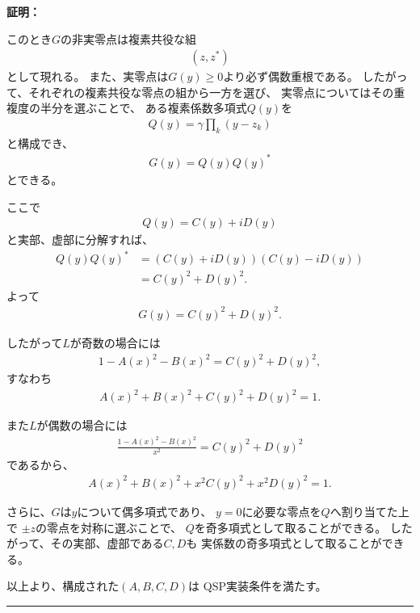 \documentclass[a4paper,10.5pt]{article}
\numberwithin{equation}{section}
\newenvironment{proofbox}
{\begin{prooflabel}\textbf{証明：}\end{prooflabel}\vspace{0.8em}}
{\par\vspace{1em}\hrule\vspace{1em}}
\begin{document}
\begin{proofbox}
    このとき$G$の非実零点は複素共役な組
    \begin{align*}
        (z,z^*)
    \end{align*}
    として現れる。
    また、実零点は$G(y)\geq0$より必ず偶数重根である。
    したがって、それぞれの複素共役な零点の組から一方を選び、
    実零点についてはその重複度の半分を選ぶことで、
    ある複素係数多項式$Q(y)$を
    \begin{align*}
        Q(y)=\gamma\prod_k(y-z_k)
    \end{align*}
    と構成でき、
    \begin{align*}
        G(y)=Q(y)Q(y)^*
    \end{align*}
    とできる。

    ここで
    \begin{align*}
        Q(y)=C(y)+iD(y)
    \end{align*}
    と実部、虚部に分解すれば、
    \begin{align*}
        Q(y)Q(y)^*
        &=(C(y)+iD(y))(C(y)-iD(y))\\
        &=C(y)^2+D(y)^2.
    \end{align*}
    よって
    \begin{align*}
        G(y)=C(y)^2+D(y)^2.
    \end{align*}

    したがって$L$が奇数の場合には
    \begin{align*}
        1-A(x)^2-B(x)^2
        =C(y)^2+D(y)^2,
    \end{align*}
    すなわち
    \begin{align*}
        A(x)^2+B(x)^2+C(y)^2+D(y)^2=1.
    \end{align*}

    また$L$が偶数の場合には
    \begin{align*}
        \frac{1-A(x)^2-B(x)^2}{x^2}
        =C(y)^2+D(y)^2
    \end{align*}
    であるから、
    \begin{align*}
        A(x)^2+B(x)^2
        +x^2C(y)^2+x^2D(y)^2=1.
    \end{align*}

    さらに、$G$は$y$について偶多項式であり、
    $y=0$に必要な零点を$Q$へ割り当てた上で
    $\pm z$の零点を対称に選ぶことで、
    $Q$を奇多項式として取ることができる。
    したがって、その実部、虚部である$C,D$も
    実係数の奇多項式として取ることができる。

    以上より、構成された$(A,B,C,D)$は
    QSP実装条件を満たす。
\end{proofbox}
\end{document}
